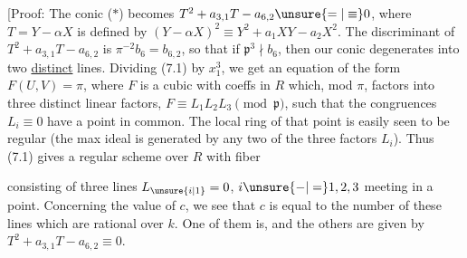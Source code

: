 [Proof: The conic ($*$) becomes $T^2+a_{3,1}T-a_{6,2}\unsure{=|\equiv}0$, where $T=Y-\alpha X$ is defined by $(Y-\alpha X)^2\equiv Y^2+a_1XY-a_2X^2$. The discriminant of $T^2+a_{3,1}T-a_{6,2}$ is $\pi^{-2} b_6=b_{6,2}$, so that if $\mathfrak p^3\nmid b_6$, then our conic degenerates into two \uline{distinct} lines. Dividing (7.1) by $x_1^3$, we get an equation of the form $F(U,V)=\pi$, where $F$ is a cubic with coeffs in $R$ which, mod $\pi$, factors into three distinct linear factors, $F\equiv L_1L_2L_3\pmod{\mathfrak p}$, such that the congruences $L_i\equiv0$ have a point in common. The local ring of that point is easily seen to be regular (the max ideal is generated by any two of the three factors $L_i$). Thus (7.1) gives a regular scheme over $R$ with fiber
\parbox[c]{1.48cm}{\setlength{\topsep}{0pt}}
consisting of three lines $L_{\unsure{i|1}}=0$, $i\unsure{-|=}1,2,3$ meeting in a point. Concerning the value of $c$, we see that $c$ is equal to the number of these lines which are rational over $k$. One of them is, and the others are given by $T^2+a_{3,1}T-a_{6,2}\equiv0$.
\normalmarginpar
\clearpage
